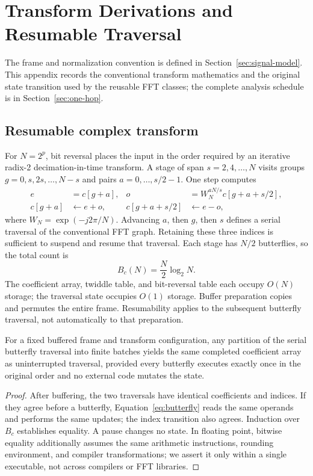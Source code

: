 \section{Transform Derivations and Resumable Traversal}
\label{sec:legacy-transform}
The frame and normalization convention is defined in
Section~\ref{sec:signal-model}. This appendix records the conventional
transform mathematics and the original state transition used by the reusable
FFT classes; the complete analysis schedule is in Section~\ref{sec:one-hop}.

\subsection{Resumable complex transform}
For $N=2^p$, bit reversal places the input in the order required by an iterative
radix-2 decimation-in-time transform. A stage of span $s=2,4,\ldots,N$ visits
groups $g=0,s,2s,\ldots,N-s$ and pairs $a=0,\ldots,s/2-1$. One step computes
\begin{align}
 e&=c[g+a], & o&=W_N^{aN/s}c[g+a+s/2],\\
 c[g+a]&\leftarrow e+o, & c[g+a+s/2]&\leftarrow e-o,
 \label{eq:butterfly}
\end{align}
where $W_N=\exp(-j2\pi/N)$. Advancing $a$, then $g$, then $s$ defines a serial
traversal of the conventional FFT graph. Retaining these three indices is
sufficient to suspend and resume that traversal. Each stage has $N/2$
butterflies, so the total count is
\begin{equation}
 B_c(N)=\frac{N}{2}\log_2 N.
 \label{eq:countcomplex}
\end{equation}
The coefficient array, twiddle table, and bit-reversal table each occupy
$O(N)$ storage; the traversal state occupies $O(1)$ storage. Buffer preparation
copies and permutes the entire frame. Resumability applies to the subsequent
butterfly traversal, not automatically to that preparation.

\begin{proposition}
For a fixed buffered frame and transform configuration, any partition of the
serial butterfly traversal into finite batches yields the same completed
coefficient array as uninterrupted traversal, provided every butterfly executes
exactly once in the original order and no external code mutates the state.
\end{proposition}
\begin{proof}
After buffering, the two traversals have identical coefficients and indices.
If they agree before a butterfly, Equation~\eqref{eq:butterfly} reads the same
operands and performs the same updates; the index transition also agrees.
Induction over $B_c$ establishes equality. A pause changes no state. In floating
point, bitwise equality additionally assumes the same arithmetic instructions,
rounding environment, and compiler transformations; we assert it only within
a single executable, not across compilers or FFT libraries.
\end{proof}

